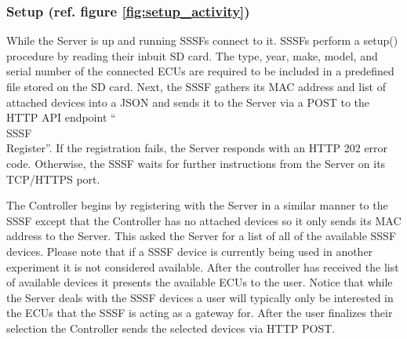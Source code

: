 \documentclass[letterpaper,twocolumn,12pt]{article}
\begin{document}
\subsubsection{Setup (ref. figure \ref{fig:setup_activity})}
While the Server is up and running SSSFs connect to it. SSSFs perform a setup() procedure by reading their inbuit SD card. The type, year, make, model, and serial number of the connected ECUs are required to be included in a predefined file stored on the SD card. 
Next, the SSSF gathers its MAC address and list of attached devices into a JSON and sends it to the Server via a POST to the HTTP API endpoint “\\SSSF\\Register”. 
If the registration fails, the Server responds with an HTTP 202 error code. Otherwise, the SSSF waits for further instructions from the Server on its TCP/HTTPS port. 

The Controller begins by registering with the Server in a similar manner to the SSSF except that the Controller has no attached devices so it only sends its MAC address to the Server.
This asked the Server for a list of all of the available SSSF devices. Please note that if a SSSF device is currently being used in another experiment it is not considered available. After the controller has received the list of available devices it presents the available ECUs to the user. Notice that while the Server deals with the SSSF devices a user will typically only be interested in the ECUs that the SSSF is acting as a gateway for. After the user finalizes their selection the Controller sends the selected devices via HTTP POST.
\end{document}
